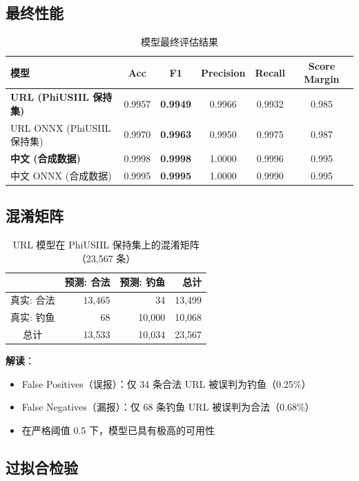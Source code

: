 \documentclass[11pt,a4paper]{article}
\begin{document}
\subsection{最终性能}

\begin{table}[h]
\centering
\caption{模型最终评估结果}
\begin{tabular}{lccccc}
\toprule
模型 & Acc & F1 & Precision & Recall & Score Margin \\
\midrule
\textbf{URL (PhiUSIIL 保持集)} & 0.9957 & \textbf{0.9949} & 0.9966 & 0.9932 & 0.985 \\
URL ONNX (PhiUSIIL 保持集) & 0.9970 & \textbf{0.9963} & 0.9950 & 0.9975 & 0.987 \\
\midrule
\textbf{中文 (合成数据)} & 0.9998 & \textbf{0.9998} & 1.0000 & 0.9996 & 0.995 \\
中文 ONNX (合成数据) & 0.9995 & \textbf{0.9995} & 1.0000 & 0.9990 & 0.995 \\
\bottomrule
\end{tabular}
\end{table}

\subsection{混淆矩阵}

\begin{table}[h]
\centering
\caption{URL 模型在 PhiUSIIL 保持集上的混淆矩阵（23,567 条）}
\begin{tabular}{crrr}
\toprule
& 预测: 合法 & 预测: 钓鱼 & 总计 \\
\midrule
真实: 合法 & 13,465 & 34 & 13,499 \\
真实: 钓鱼 & 68 & 10,000 & 10,068 \\
\midrule
总计 & 13,533 & 10,034 & 23,567 \\
\bottomrule
\end{tabular}
\end{table}

\textbf{解读}：
\begin{itemize}
  \item False Positives（误报）：仅 34 条合法 URL 被误判为钓鱼（0.25\%）
  \item False Negatives（漏报）：仅 68 条钓鱼 URL 被误判为合法（0.68\%）
  \item 在严格阈值 0.5 下，模型已具有极高的可用性
\end{itemize}

\subsection{过拟合检验}
\end{document}
